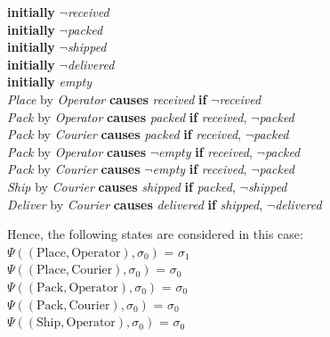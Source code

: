 \documentclass[a4paper]{article}
\begin{document}
\begin{center}
\textbf{initially} $\neg$\textit{received} \\[0.1\baselineskip]
\textbf{initially} $\neg$\textit{packed} \\[0.1\baselineskip]
\textbf{initially} $\neg$\textit{shipped} \\[0.1\baselineskip]
\textbf{initially} $\neg$\textit{delivered} \\[0.1\baselineskip]
\textbf{initially} \textit{empty} \\[0.5\baselineskip]
\textit{Place} by \textit{Operator} \textbf{causes} \textit{received} \textbf{if} $\neg$\textit{received} \\[0.1\baselineskip]
\textit{Pack} by \textit{Operator} \textbf{causes} \textit{packed} \textbf{if} \textit{received}, $\neg$\textit{packed} \\[0.1\baselineskip]
\textit{Pack} by \textit{Courier} \textbf{causes} \textit{packed} \textbf{if} \textit{received}, $\neg$\textit{packed} \\[0.1\baselineskip]
\textit{Pack} by \textit{Operator} \textbf{causes} $\neg$\textit{empty} \textbf{if} \textit{received}, $\neg$\textit{packed} \\[0.1\baselineskip]
\textit{Pack} by \textit{Courier} \textbf{causes} $\neg$\textit{empty} \textbf{if} \textit{received}, $\neg$\textit{packed} \\[0.1\baselineskip]
\textit{Ship} by \textit{Courier} \textbf{causes} \textit{shipped} \textbf{if} \textit{packed}, $\neg$\textit{shipped} \\[0.1\baselineskip]
\textit{Deliver} by \textit{Courier} \textbf{causes} \textit{delivered} \textbf{if} \textit{shipped}, $\neg$\textit{delivered} \\[0.5\baselineskip]
\end{center}
Hence, the following states are considered in this case: \\[0.5\baselineskip] 
$\Psi((\text{Place},\text{Operator}),\sigma_0)$ = $\sigma_1$ \\[0.1\baselineskip] 
$\Psi((\text{Place},\text{Courier}),\sigma_0)$ = $\sigma_0$ \\[0.1\baselineskip] 
$\Psi((\text{Pack},\text{Operator}),\sigma_0)$ = $\sigma_0$ \\[0.1\baselineskip] 
$\Psi((\text{Pack},\text{Courier}),\sigma_0)$ = $\sigma_0$ \\[0.1\baselineskip] 
$\Psi((\text{Ship},\text{Operator}),\sigma_0)$ = $\sigma_0$ \\[0.1\baselineskip] 
\end{document}
